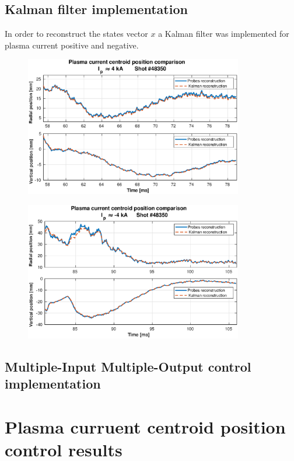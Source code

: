 \subsection{Kalman filter implementation}
In order to reconstruct the states vector $x$ a Kalman filter was implemented for plasma current positive and negative.\smallskip
\begin{figure}
	\centering
	\includegraphics[width=0.85\textwidth]{Chp5/Kalman_comp_pos.eps}
	\caption{\label{Kalman_pos}}
\end{figure}

\begin{figure}
	\centering
	\includegraphics[width=0.85\textwidth]{Chp5/Kalman_comp_neg.eps}
	\caption{\label{Kalman_neg}}
\end{figure}

\subsection{Multiple-Input Multiple-Output control implementation}
	




\section{Plasma curruent centroid position control results}

